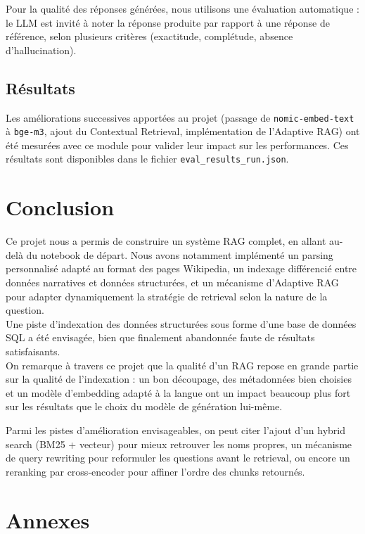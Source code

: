 \documentclass[11pt]{report}
\begin{document}
    Pour la qualité des réponses générées, nous utilisons une évaluation automatique : le LLM est invité à noter la réponse produite par rapport à une réponse de référence, selon plusieurs critères (exactitude, complétude, absence d'hallucination).

    \section{Résultats}

    Les améliorations successives apportées au projet (passage de \texttt{nomic-embed-text} à \texttt{bge-m3}, ajout du Contextual Retrieval, implémentation de l'Adaptive RAG) ont été mesurées avec ce module pour valider leur impact sur les performances. Ces résultats sont disponibles dans le fichier \texttt{eval\_results\_run.json}.

    \chapter{Conclusion}

    Ce projet nous a permis de construire un système RAG complet, en allant au-delà du notebook de départ. Nous avons notamment implémenté un parsing personnalisé adapté au format des pages Wikipedia, un indexage différencié entre données narratives et données structurées, et un mécanisme d'Adaptive RAG pour adapter dynamiquement la stratégie de retrieval selon la nature de la question. \\
    
    Une piste d'indexation des données structurées sous forme d'une base de données SQL a été envisagée, bien que finalement abandonnée faute de résultats satisfaisants. \\

    On remarque à travers ce projet que la qualité d'un RAG repose en grande partie sur la qualité de l'indexation : un bon découpage, des métadonnées bien choisies et un modèle d'embedding adapté à la langue ont un impact beaucoup plus fort sur les résultats que le choix du modèle de génération lui-même.

    Parmi les pistes d'amélioration envisageables, on peut citer l'ajout d'un hybrid search (BM25 + vecteur) pour mieux retrouver les noms propres, un mécanisme de query rewriting pour reformuler les questions avant le retrieval, ou encore un reranking par cross-encoder pour affiner l'ordre des chunks retournés.

    \chapter{Annexes}
 
\end{document}
